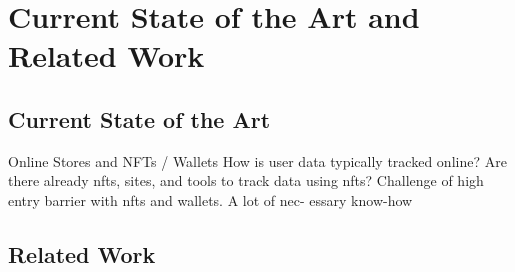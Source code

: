 \chapter{Current State of the Art and Related Work}
\label{ch:SOTA}

%
%
\section{Current State of the Art}
\label{sec:sota:stateOfTheArt}

Online Stores and NFTs / Wallets
How is user data typically tracked online? 
Are there already nfts, sites, and tools to track data using nfts? 
Challenge of high entry barrier with nfts and wallets. A lot of nec- essary know-how 


%
%
\section{Related Work}
\label{sec:sota:relatedWork}

